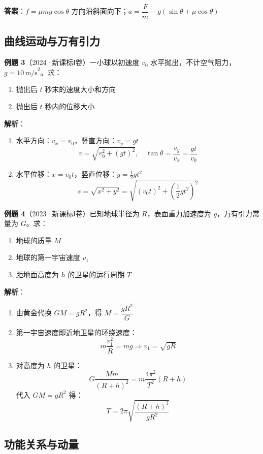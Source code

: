 \textbf{答案}：$f = \mu mg\cos\theta$ 方向沿斜面向下；$a = \dfrac{F}{m} - g(\sin\theta + \mu\cos\theta)$

\subsection{曲线运动与万有引力}

\textbf{例题 3}（2024·新课标Ⅰ卷）一小球以初速度 $v_0$ 水平抛出，不计空气阻力，$g = 10\,\text{m/s}^2$。求：
\begin{enumerate}
  \item 抛出后 $t$ 秒末的速度大小和方向
  \item 抛出后 $t$ 秒内的位移大小
\end{enumerate}

\textbf{解析}：
\begin{enumerate}
  \item 水平方向：$v_x = v_0$，竖直方向：$v_y = gt$
  \[
  v = \sqrt{v_0^2 + (gt)^2},\quad \tan\theta = \frac{v_y}{v_x} = \frac{gt}{v_0}
  \]
  \item 水平位移：$x = v_0t$，竖直位移：$y = \frac12 gt^2$
  \[
  s = \sqrt{x^2 + y^2} = \sqrt{(v_0t)^2 + \left(\frac12 gt^2\right)^2}
  \]
\end{enumerate}

\vspace{1em}

\textbf{例题 4}（2023·新课标Ⅰ卷）已知地球半径为 $R$，表面重力加速度为 $g$，万有引力常量为 $G$。求：
\begin{enumerate}
  \item 地球的质量 $M$
  \item 地球的第一宇宙速度 $v_1$
  \item 距地面高度为 $h$ 的卫星的运行周期 $T$
\end{enumerate}

\textbf{解析}：
\begin{enumerate}
  \item 由黄金代换 $GM = gR^2$，得 $M = \dfrac{gR^2}{G}$
  \item 第一宇宙速度即近地卫星的环绕速度：
  \[
  m\frac{v_1^2}{R} = mg \Rightarrow v_1 = \sqrt{gR}
  \]
  \item 对高度为 $h$ 的卫星：
  \[
  G\frac{Mm}{(R+h)^2} = m\frac{4\pi^2}{T^2}(R+h)
  \]
  代入 $GM = gR^2$ 得：
  \[
  T = 2\pi\sqrt{\frac{(R+h)^3}{gR^2}}
  \]
\end{enumerate}

\subsection{功能关系与动量}

